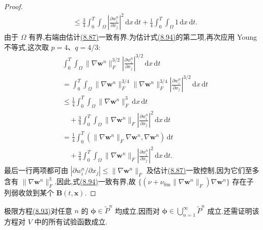 \begin{lemma}[极限方程]
\begin{proof}
\[\begin{aligned}
 &\le \frac34\int_0^T\int_\Omega
   \left|\frac{\partial w_i^n}{\partial x_j}\right|^2
                       \,\mathrm{d}x\,\mathrm{d}t
 +\frac14\int_0^T\int_\Omega 1\,\mathrm{d}x\,\mathrm{d}t.
\end{aligned}
\]
由于 $\Omega$ 有界,右端由估计\hyperref[eq:smagorinsky-galerkin-energy-estimate]{(8.87)}一致有界.为估计式\hyperref[eq:smagorinsky-viscous-component-bound]{(8.94)}的第二项,再次应用 Young 不等式,这次取 $p=4$、$q=4/3$:
\[
\begin{aligned}
 &\int_0^T\int_\Omega
      \|\nabla\bm{w}^n\|_F^{3/2}
      \left|\frac{\partial w_i^n}{\partial x_j}\right|^{3/2}
                            \,\mathrm{d}x\,\mathrm{d}t\\
 &=\int_0^T\int_\Omega
      \|\nabla\bm{w}^n\|_F^{3/4}
      \|\nabla\bm{w}^n\|_F^{3/4}
      \left|\frac{\partial w_i^n}{\partial x_j}\right|^{3/2}
                            \,\mathrm{d}x\,\mathrm{d}t\\
 &\le \frac14\int_0^T\int_\Omega
             \|\nabla\bm{w}^n\|_F^3\,\mathrm{d}x\,\mathrm{d}t\\
 &\quad+\frac34\int_0^T\int_\Omega
       \|\nabla\bm{w}^n\|_F
       \left|\frac{\partial w_i^n}{\partial x_j}\right|^2
                               \,\mathrm{d}x\,\mathrm{d}t\\
 &=\frac14\int_0^T
       (\|\nabla\bm{w}^n\|_F\nabla\bm{w}^n,
                            \nabla\bm{w}^n)\,\mathrm{d}t\\
 &\quad+\frac34\int_0^T\int_\Omega
       \|\nabla\bm{w}^n\|_F
       \left|\frac{\partial w_i^n}{\partial x_j}\right|^2
                               \,\mathrm{d}x\,\mathrm{d}t.
\end{aligned}
\]
最后一行两项都可由 $|\partial w_i^n/\partial x_j|\le\|\nabla\bm{w}^n\|_F$ 及估计\hyperref[eq:smagorinsky-galerkin-energy-estimate]{(8.87)}一致控制,因为它们至多含有 $\|\nabla\bm{w}^n\|_F^3$.因此,式\hyperref[eq:smagorinsky-viscous-component-bound]{(8.94)}一致有界,故
$\{(\nu+\nu_{\mathrm{Sm}}\|\nabla\bm{w}^n\|_F)\nabla\bm{w}^n\}$ 存在子列弱收敛到某个 $\bm{B}(t,\bm{x})$.
\end{proof}
\end{lemma}

\begin{note}[关于极限方程]
\label{note:smagorinsky-limiting-equation}
极限方程\hyperref[eq:smagorinsky-limiting-equation]{(8.93)}对任意 $n$ 的 $\symbf{\phi}\in\widetilde{P}^n$ 均成立,因而对
$\symbf{\phi}\in\bigcup_{n=1}^{\infty}\widetilde{P}^n$ 成立.还需证明该方程对 $V$ 中的所有试验函数成立.
\end{note}

